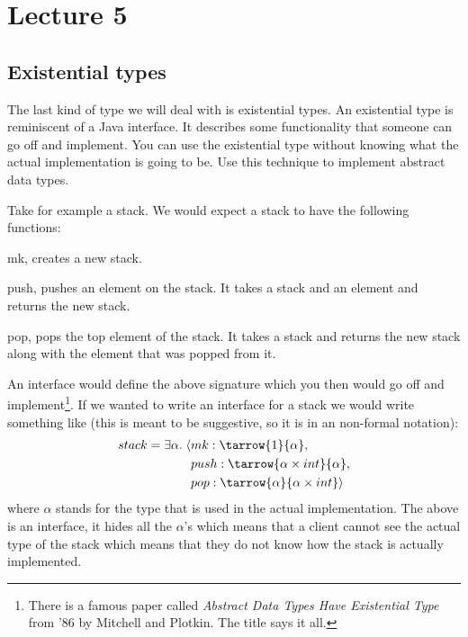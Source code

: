 \section*{Lecture 5}

\subsection*{Existential types}
The last kind of type we will deal with is existential types. An existential type is reminiscent of a Java interface. It describes some functionality that someone can go off and implement. You can use the existential type without knowing what the actual implementation is going to be. Use this technique to implement abstract data types.

Take for example a stack. We would expect a stack to have the following functions:
\begin{description}
  \item{mk}, creates a new stack.
  \item{push}, pushes an element on the stack. It takes a stack and an element and returns the new stack.
  \item{pop}, pops the top element of the stack. It takes a stack and returns the new stack along with the element that was popped from it.
\end{description}
An interface would define the above signature which you then would go off and implement\footnote{There is a famous paper called \emph{Abstract Data Types Have Existential Type} from '86 by Mitchell and Plotkin. The title says it all.}. If we wanted to write an interface for a stack we would write something like (this is meant to be suggestive, so it is in an non-formal notation):
\begin{align*}
  stack = \exists \alpha.\; \langle & mk: \tarrow{1}{\alpha}, \\
                                 & push: \tarrow{\alpha \times int}{\alpha}, \\
                                 & pop: \tarrow{\alpha}{\alpha \times int} \rangle
\end{align*}
where $\alpha$ stands for the type that is used in the actual implementation. The above is an interface, it hides all the $\alpha$'s which means that a client cannot see the actual type of the stack which means that they do not know how the stack is actually implemented.

